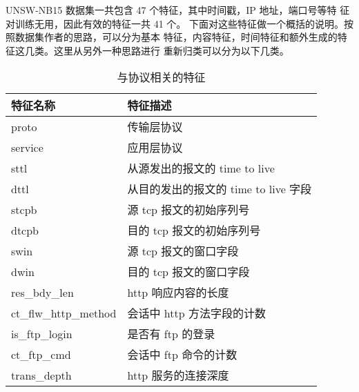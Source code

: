 

 
UNSW-NB15 数据集一共包含 47 个特征，其中时间戳，IP 地址，端口号等特
征对训练无用，因此有效的特征一共 41 个。 
下面对这些特征做一个概括的说明。按照数据集作者的思路，可以分为基本
特征，内容特征，时间特征和额外生成的特征这几类。这里从另外一种思路进行
重新归类可以分为以下几类。


\begin{table}[H]
    \caption{与协议相关的特征}
    \centering
    \begin{tabular}{|l|l|}
    \hline
    特征名称                  & 特征描述                      \\ \hline
    proto                 & 传输层协议                     \\ \hline
    service               & 应用层协议                     \\ \hline
    sttl                  & 从源发出的报文的 time to live     \\ \hline
    dttl                  & 从目的发出的报文的 time to live 字段 \\ \hline
    stcpb                 & 源 tcp 报文的初始序列号            \\ \hline
    dtcpb                 & 目的 tcp 报文的初始序列号           \\ \hline
    swin                  & 源 tcp 报文的窗口字段             \\ \hline
    dwin                  & 目的 tcp 报文的窗口字段            \\ \hline
    res\_bdy\_len         & http 响应内容的长度              \\ \hline
    ct\_flw\_http\_method & 会话中 http 方法字段的计数          \\ \hline
    is\_ftp\_login        & 是否有 ftp 的登录               \\ \hline
    ct\_ftp\_cmd          & 会话中 ftp 命令的计数             \\ \hline
    trans\_depth          & http 服务的连接深度              \\ \hline
    \end{tabular}
    \end{table}

